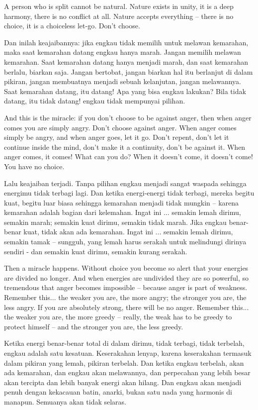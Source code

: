 \english
A person who is split cannot be natural. Nature exists in unity, it is a deep harmony, there is no conflict at all. Nature accepts everything -- there is no choice, it is a choiceless let-go. Don't choose.

\bahasa
Dan inilah keajaibannya: jika engkau tidak memilih untuk melawan kemarahan, maka saat kemarahan datang engkau hanya marah. Jangan memilih melawan kemarahan. Saat kemarahan datang hanya menjadi marah, dan saat kemarahan berlalu, biarkan saja. Jangan bertobat, jangan biarkan hal itu berlanjut di dalam pikiran, jangan membuatnya menjadi sebuah kelanjutan, jangan melawannya. Saat kemarahan datang, itu datang! Apa yang bisa engkau lakukan? Bila tidak datang, itu tidak datang! engkau tidak mempunyai pilihan.

\english
And this is the miracle: if you don't choose to be against anger, then when anger comes you are simply angry. Don't choose against anger. When anger comes simply be angry, and when anger goes, let it go. Don't repent, don't let it continue inside the mind, don't make it a continuity, don't be against it. When anger comes, it comes! What can you do? When it doesn't come, it doesn't come! You have no choice.

\bahasa
Lalu keajaiban terjadi. Tanpa pilihan engkau menjadi sangat waspada sehingga energimu tidak terbagi lagi. Dan ketika energi-energi tidak terbagi, mereka begitu kuat, begitu luar biasa sehingga kemarahan menjadi tidak mungkin -- karena kemarahan adalah bagian dari kelemahan. Ingat ini ... semakin lemah dirimu, semakin marah; semakin kuat dirimu, semakin tidak marah. Jika engkau benar-benar kuat, tidak akan ada kemarahan. Ingat ini ... semakin lemah dirimu, semakin tamak -- sungguh, yang lemah harus serakah untuk melindungi dirinya sendiri - dan semakin kuat dirimu, semakin kurang serakah.

\english
Then a miracle happens. Without choice you become so alert that your energies are divided no longer. And when energies are undivided they are so powerful, so tremendous that anger becomes impossible -- because anger is part of weakness. Remember this... the weaker you are, the more angry; the stronger you are, the less angry. If you are absolutely strong, there will be no anger. Remember this... the weaker you are, the more greedy -- really, the weak has to be greedy to protect himself -- and the stronger you are, the less greedy.

\bahasa
Ketika energi benar-benar total di dalam dirimu, tidak terbagi, tidak terbelah, engkau adalah satu kesatuan. Keserakahan lenyap, karena keserakahan termasuk dalam pikiran yang lemah, pikiran terbelah. Dan ketika engkau terbelah, akan ada kemarahan, dan engkau akan melawannya, dan perpecahan yang lebih besar akan tercipta dan lebih banyak energi akan hilang. Dan engkau akan menjadi penuh dengan kekacauan batin, anarki, bukan satu nada yang harmonis di manapun. Semuanya akan tidak selaras.

